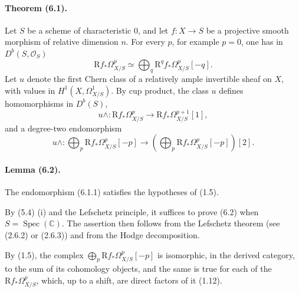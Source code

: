 \documentclass[10pt]{article}
\newcommand{\R}{\mathrm R}
\providecommand{\C}{\mathbb C}
\providecommand{\Spec}{\operatorname{Spec}}
\providecommand{\Ocal}{\mathcal O}
\begin{document}
\paragraph{Theorem (6.1).} Let $S$ be a scheme of characteristic $0$, and let $f:X\to S$ be a projective smooth morphism of relative dimension $n$. For every $p$, for example $p=0$, one has in $D^b(S,\Ocal_S)$
\[
\R f_*\Omega_{X/S}^p\simeq\bigoplus_q\R^qf_*\Omega_{X/S}^p[-q].
\]
Let $u$ denote the first Chern class of a relatively ample invertible sheaf on $X$, with values in $H^1(X,\Omega_{X/S}^1)$. By cup product, the class $u$ defines homomorphisms in $D^b(S)$,
\[
u\wedge:\R f_*\Omega_{X/S}^p\longrightarrow\R f_*\Omega_{X/S}^{p+1}[1],
\]
and a degree-two endomorphism
\[
\tag{6.1.1}
u\wedge:\bigoplus_p\R f_*\Omega_{X/S}^p[-p]
\longrightarrow
\left(\bigoplus_p\R f_*\Omega_{X/S}^p[-p]\right)[2].
\]

\paragraph{Lemma (6.2).} The endomorphism (6.1.1) satisfies the hypotheses of (1.5).

By (5.4) (i) and the Lefschetz principle, it suffices to prove (6.2) when $S=\Spec(\C)$. The assertion then follows from the Lefschetz theorem (see (2.6.2) or (2.6.3)) and from the Hodge decomposition.

By (1.5), the complex $\bigoplus_p\R f_*\Omega_{X/S}^p[-p]$ is isomorphic, in the derived category, to the sum of its cohomology objects, and the same is true for each of the $\R f_*\Omega_{X/S}^p$, which, up to a shift, are direct factors of it (1.12).
\end{document}
